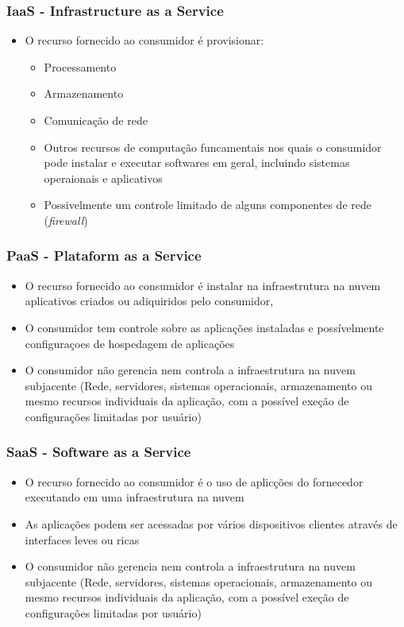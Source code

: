 \begin{frame}
	\frametitle{IaaS - Infrastructure as a Service}
	\begin{itemize}
		\item O recurso fornecido ao consumidor é provisionar:
			\begin{itemize}
				\item Processamento
				\item Armazenamento
				\item Comunicação de rede
				\item Outros recursos de computação funcamentais nos quais o consumidor pode instalar e executar softwares em geral, incluindo sistemas operaionais e aplicativos
				\item Possivelmente um controle limitado de alguns componentes de rede (\textit{firewall})
			\end{itemize}
	\end{itemize}
\end{frame}

\begin{frame}
	\frametitle{PaaS - Plataform as a Service}
	\begin{itemize}
		\item O recurso fornecido ao consumidor é instalar na infraestrutura na nuvem aplicativos criados ou adiquiridos pelo consumidor,
		\item O consumidor tem controle sobre as aplicações instaladas e possívelmente configuraçoes de hospedagem de aplicações
		\item O consumidor não gerencia nem controla a infraestrutura na nuvem subjacente (Rede, servidores, sistemas operacionais, armazenamento ou mesmo recursos individuais da aplicação, com a possível exeção de configurações limitadas por usuário)
	\end{itemize}
\end{frame}

\begin{frame}
	\frametitle{SaaS - Software as a Service}
	\begin{itemize}
		\item O recurso fornecido ao consumidor é o uso de aplicções do fornecedor executando em uma infraestrutura na nuvem
		\item As aplicações podem ser acessadas por vários dispositivos clientes através de interfaces leves ou ricas
		\item O consumidor não gerencia nem controla a infraestrutura na nuvem subjacente (Rede, servidores, sistemas operacionais, armazenamento ou mesmo recursos individuais da aplicação, com a possível exeção de configurações limitadas por usuário)
	\end{itemize}
\end{frame}

